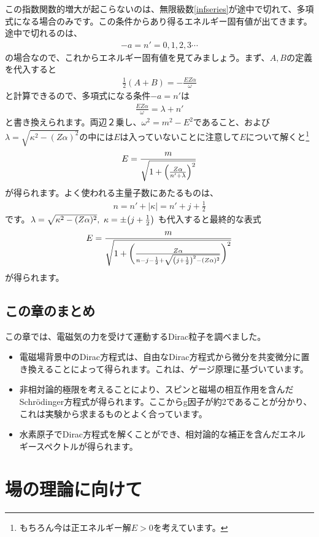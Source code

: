 \documentclass[report,paper=a4, fontsize=12pt, line_length=16cm, number_of_lines=33,dvipdfmx]{jlreq}
\numberwithin{equation}{chapter}
\begin{document}
この指数関数的増大が起こらないのは、無限級数\eqref{infseries}が途中で切れて、多項式になる場合のみです。この条件からあり得るエネルギー固有値が出てきます。途中で切れるのは、
\begin{align}
  -a=n'=0,1,2,3\cdots
\end{align}
の場合なので、これからエネルギー固有値を見てみましょう。まず、$A,B$の定義を代入すると
\begin{align}
  \frac12(A+B)=-\frac{EZ\alpha}{\omega}
\end{align}
と計算できるので、多項式になる条件$-a=n'$は
\begin{align}
  \frac{EZ\alpha}{\omega}=\lambda+n'
\end{align}
と書き換えられます。両辺２乗し、$\omega^2=m^2-E^2$であること、および$\lambda=\sqrt{\kappa^2-(Z\alpha)^2}$の中には$E$は入っていないことに注意して$E$について解くと\footnote{もちろん今は正エネルギー解$E>0$を考えています。}
\begin{align}
  E=\frac{m}{\sqrt{1+\qty(\frac{Z\alpha}{n'+\lambda})^2}}
\end{align}
が得られます。よく使われる主量子数にあたるものは、
\begin{align}
  n=n'+|\kappa|=n'+j+\frac12
\end{align}
です。$\lambda=\sqrt{\kappa^2-(Z\alpha)^2},\ \kappa=\pm\qty(j+\frac12)$ も代入すると最終的な表式
\begin{align}
  E=\frac{m}{\sqrt{1+\qty(\frac{Z\alpha}{n-j-\frac12+\sqrt{\qty(j+\frac12)^2-(Z\alpha)^2}})^2}}
\end{align}
が得られます。

\section{この章のまとめ}
この章では、電磁気の力を受けて運動するDirac粒子を調べました。
\begin{itemize}
  \item 電磁場背景中のDirac方程式は、自由なDirac方程式から微分を共変微分に置き換えることによって得られます。これは、ゲージ原理に基づいています。
  \item 非相対論的極限を考えることにより、スピンと磁場の相互作用を含んだSchrödinger方程式が得られます。ここからg因子が約2であることが分かり、これは実験から求まるものとよく合っています。
  \item 水素原子でDirac方程式を解くことができ、相対論的な補正を含んだエネルギースペクトルが得られます。
\end{itemize}


\chapter{場の理論に向けて}
\end{document}
